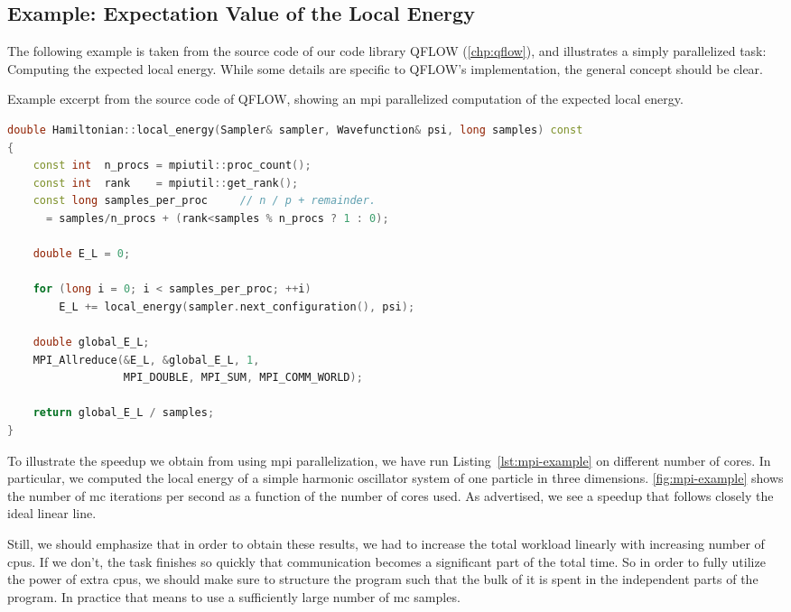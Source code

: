 \documentclass[Thesis.tex]{subfiles}
\begin{document}
\subsection{Example: Expectation Value of the Local Energy}

The following example is taken from the source code of our code library QFLOW
(\cref{chp:qflow}), and illustrates a simply parallelized task: Computing the
expected local energy. While some details are specific to QFLOW's
implementation, the general concept should be clear.

\begin{lstfloat}
  \centering
\caption{Example excerpt from the source code of QFLOW, showing an \gls{mpi} parallelized computation of the expected local energy.}
\begin{lstlisting}[language=C++, label={lst:mpi-example}]
double Hamiltonian::local_energy(Sampler& sampler, Wavefunction& psi, long samples) const
{
    const int  n_procs = mpiutil::proc_count();
    const int  rank    = mpiutil::get_rank();
    const long samples_per_proc     // n / p + remainder.
      = samples/n_procs + (rank<samples % n_procs ? 1 : 0);

    double E_L = 0;

    for (long i = 0; i < samples_per_proc; ++i)
        E_L += local_energy(sampler.next_configuration(), psi);

    double global_E_L;
    MPI_Allreduce(&E_L, &global_E_L, 1,
                  MPI_DOUBLE, MPI_SUM, MPI_COMM_WORLD);

    return global_E_L / samples;
}
\end{lstlisting}
\end{lstfloat}

To illustrate the speedup we obtain from using \gls{mpi} parallelization, we have run
Listing~\ref{lst:mpi-example} on different number of cores. In particular, we computed
the local energy of a simple harmonic oscillator system of one particle in three
dimensions. \cref{fig:mpi-example} shows the number of \gls{mc} iterations per second
as a function of the number of cores used. As advertised, we see a speedup that
follows closely the ideal linear line.

Still, we should emphasize that in order to obtain these results, we had to
increase the total workload linearly with increasing number of \glspl{cpu}. If we
don't, the task finishes so quickly that communication becomes a significant
part of the total time. So in order to fully utilize the power
of extra \glspl{cpu}, we should make sure to structure the program such that the bulk of
it is spent in the independent parts of the program. In practice that means to
use a sufficiently large number of \gls{mc} samples.
\end{document}

